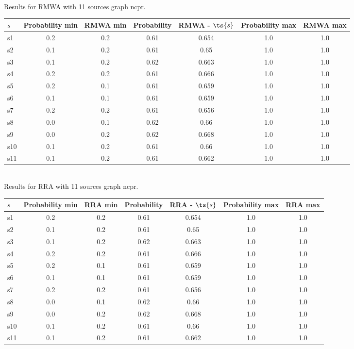 \documentclass{article}
\begin{document}
\noindent Results for RMWA with 11 sources graph ncpr.

\noindent\begin{tabular}{|l|c|c|c|c|c|c|}
\hline
$s$& Probability min & RMWA min & Probability & RMWA - $\ts{s}$ & Probability max & RMWA max\\
\hline
s1 &0.2 & 0.2 & 0.61 & 0.654 & 1.0 & 1.0\\
\hline
s2 &0.1 & 0.2 & 0.61 & 0.65 & 1.0 & 1.0\\
\hline
s3 &0.1 & 0.2 & 0.62 & 0.663 & 1.0 & 1.0\\
\hline
s4 &0.2 & 0.2 & 0.61 & 0.666 & 1.0 & 1.0\\
\hline
s5 &0.2 & 0.1 & 0.61 & 0.659 & 1.0 & 1.0\\
\hline
s6 &0.1 & 0.1 & 0.61 & 0.659 & 1.0 & 1.0\\
\hline
s7 &0.2 & 0.2 & 0.61 & 0.656 & 1.0 & 1.0\\
\hline
s8 &0.0 & 0.1 & 0.62 & 0.66 & 1.0 & 1.0\\
\hline
s9 &0.0 & 0.2 & 0.62 & 0.668 & 1.0 & 1.0\\
\hline
s10 &0.1 & 0.2 & 0.61 & 0.66 & 1.0 & 1.0\\
\hline
s11 &0.1 & 0.2 & 0.61 & 0.662 & 1.0 & 1.0\\
\hline
\end{tabular}\\

\noindent Results for RRA with 11 sources graph ncpr.

\noindent\begin{tabular}{|l|c|c|c|c|c|c|}
\hline
$s$& Probability min & RRA min & Probability & RRA - $\ts{s}$ & Probability max & RRA max\\
\hline
s1 &0.2 & 0.2 & 0.61 & 0.654 & 1.0 & 1.0\\
\hline
s2 &0.1 & 0.2 & 0.61 & 0.65 & 1.0 & 1.0\\
\hline
s3 &0.1 & 0.2 & 0.62 & 0.663 & 1.0 & 1.0\\
\hline
s4 &0.2 & 0.2 & 0.61 & 0.666 & 1.0 & 1.0\\
\hline
s5 &0.2 & 0.1 & 0.61 & 0.659 & 1.0 & 1.0\\
\hline
s6 &0.1 & 0.1 & 0.61 & 0.659 & 1.0 & 1.0\\
\hline
s7 &0.2 & 0.2 & 0.61 & 0.656 & 1.0 & 1.0\\
\hline
s8 &0.0 & 0.1 & 0.62 & 0.66 & 1.0 & 1.0\\
\hline
s9 &0.0 & 0.2 & 0.62 & 0.668 & 1.0 & 1.0\\
\hline
s10 &0.1 & 0.2 & 0.61 & 0.66 & 1.0 & 1.0\\
\hline
s11 &0.1 & 0.2 & 0.61 & 0.662 & 1.0 & 1.0\\
\hline
\end{tabular}\\
\end{document}
